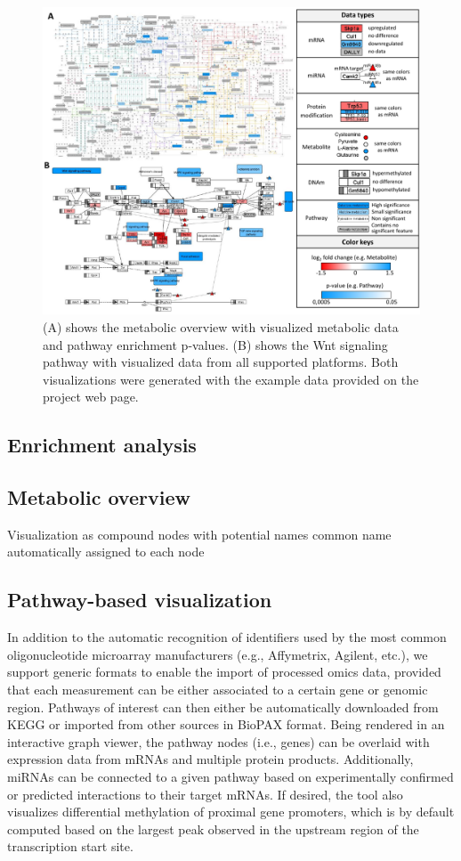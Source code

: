 \documentclass[final,5p,times,twocolumn]{elsarticle}
\begin{document}
\begin{figure}[t]
\center
\includegraphics[width=1.0\textwidth]{InCroMAP_examples.pdf}
\caption{(A) shows the metabolic overview with visualized metabolic data and pathway enrichment p-values. (B) shows the Wnt signaling pathway with visualized data from all supported platforms. Both visualizations were generated with the example data provided on the project web page.}
\label{fig:incromap-examples}
\end{figure}

\subsection{Enrichment analysis}



\subsection{Metabolic overview}
Visualization as compound nodes with potential names
common name automatically assigned to each node
\subsection{Pathway-based visualization}
In addition to the automatic recognition of identifiers used by the most common oligonucleotide microarray manufacturers (e.g., Affymetrix, Agilent, etc.), we support generic formats to enable the import of processed omics data, provided that each measurement can be either associated to a certain gene or genomic region. Pathways of interest can then either be automatically downloaded from KEGG or imported from other sources in BioPAX format. Being rendered in an interactive graph viewer, the pathway nodes (i.e., genes) can be overlaid with expression data from mRNAs and multiple protein products. Additionally, miRNAs can be connected to a given pathway based on experimentally confirmed or predicted interactions to their target mRNAs. If desired, the tool also visualizes differential methylation of proximal gene promoters, which is by default computed based on the largest peak observed in the upstream region of the transcription start site.
\end{document}
